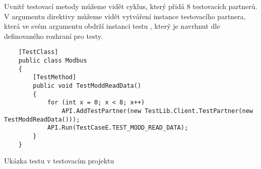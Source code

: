 Uvnitř testovací metody můžeme vidět cyklus, který přidá 8 testovacích partnerů. V argumentu direktivy můžeme vidět vytváření instance testovacího partnera, která ve svém argumentu obdrží instanci testu , který je navrhnut dle definovaného rozhraní pro testy. 




\begin{listing}[htbp]
    \centering
    \begin{verbatim}
    [TestClass]
    public class Modbus
    {
        [TestMethod]
        public void TestModdReadData()
        {
            for (int x = 0; x < 8; x++)
                API.AddTestPartner(new TestLib.Client.TestPartner(new TestModdReadData()));
            API.Run(TestCaseE.TEST_MODD_READ_DATA);
        }
    }
    \end{verbatim}
\caption{Ukázka testu v testovacím projektu}
\label{listing:testcase}
\end{listing}



